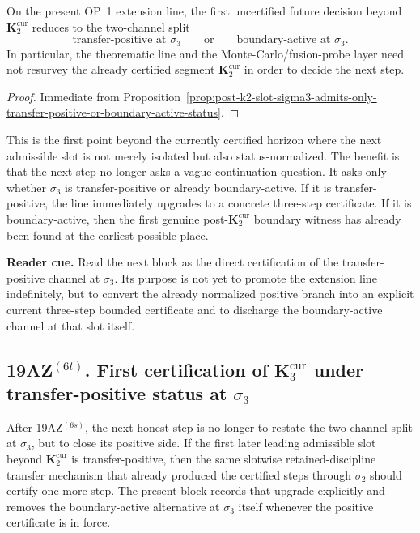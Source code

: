 \begin{corollary}
\label{cor:next-honest-op1-decision-beyond-k2cur-is-two-channel-decision-at-sigma3}
On the present OP~1 extension line, the first uncertified future decision beyond $\mathbf K_2^{\mathrm{cur}}$ reduces to the two-channel split
\[
  \text{transfer-positive at }\sigma_3
  \qquad\text{or}\qquad
  \text{boundary-active at }\sigma_3.
\]
In particular, the theorematic line and the Monte-Carlo/fusion-probe layer need not resurvey the already certified segment $\mathbf K_2^{\mathrm{cur}}$ in order to decide the next step.
\end{corollary}

\begin{proof}
Immediate from Proposition~\ref{prop:post-k2-slot-sigma3-admits-only-transfer-positive-or-boundary-active-status}.
\end{proof}

\begin{remark}
\label{rem:what-first-transfer-positive-boundary-active-split-at-sigma3-now-buys}
This is the first point beyond the currently certified horizon where the next admissible slot is not merely isolated but also status-normalized. The benefit is that the next step no longer asks a vague continuation question. It asks only whether $\sigma_3$ is transfer-positive or already boundary-active. If it is transfer-positive, the line immediately upgrades to a concrete three-step certificate. If it is boundary-active, then the first genuine post-$\mathbf K_2^{\mathrm{cur}}$ boundary witness has already been found at the earliest possible place.
\end{remark}


\noindent\textbf{Reader cue.} Read the next block as the direct certification of the transfer-positive channel at $\sigma_3$. Its purpose is not yet to promote the extension line indefinitely, but to convert the already normalized positive branch into an explicit current three-step bounded certificate and to discharge the boundary-active channel at that slot itself.

\subsection*{19AZ$^{(6t)}$. First certification of $\mathbf K_3^{\mathrm{cur}}$ under transfer-positive status at $\sigma_3$}
\label{sec:first-certification-of-k3cur-under-transfer-positive-status-at-sigma3}
After 19AZ$^{(6s)}$, the next honest step is no longer to restate the two-channel split at $\sigma_3$, but to close its positive side. If the first later leading admissible slot beyond $\mathbf K_2^{\mathrm{cur}}$ is transfer-positive, then the same slotwise retained-discipline transfer mechanism that already produced the certified steps through $\sigma_2$ should certify one more step. The present block records that upgrade explicitly and removes the boundary-active alternative at $\sigma_3$ itself whenever the positive certificate is in force.

